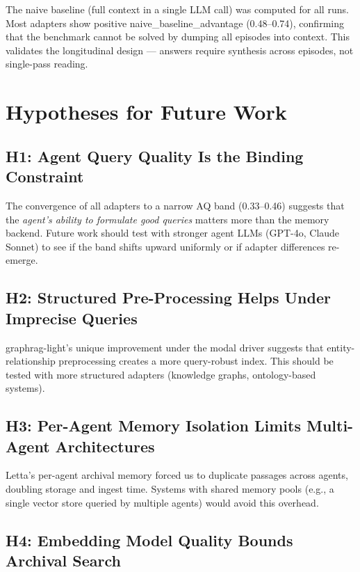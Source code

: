 \documentclass[11pt,a4paper]{article}
\begin{document}
The naive baseline (full context in a single LLM call) was computed for all runs.
Most adapters show positive naive\_baseline\_advantage (0.48--0.74), confirming that the benchmark cannot be solved by dumping all episodes into context.
This validates the longitudinal design --- answers require synthesis across episodes, not single-pass reading.

\section{Hypotheses for Future Work}

\subsection{H1: Agent Query Quality Is the Binding Constraint}

The convergence of all adapters to a narrow AQ band (0.33--0.46) suggests that the \emph{agent's ability to formulate good queries} matters more than the memory backend.
Future work should test with stronger agent LLMs (GPT-4o, Claude Sonnet) to see if the band shifts upward uniformly or if adapter differences re-emerge.

\subsection{H2: Structured Pre-Processing Helps Under Imprecise Queries}

graphrag-light's unique improvement under the modal driver suggests that entity-relationship preprocessing creates a more query-robust index.
This should be tested with more structured adapters (knowledge graphs, ontology-based systems).

\subsection{H3: Per-Agent Memory Isolation Limits Multi-Agent Architectures}

Letta's per-agent archival memory forced us to duplicate passages across agents, doubling storage and ingest time.
Systems with shared memory pools (e.g., a single vector store queried by multiple agents) would avoid this overhead.

\subsection{H4: Embedding Model Quality Bounds Archival Search}
\end{document}
